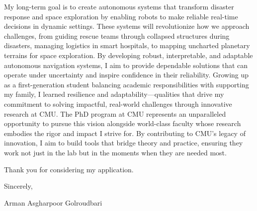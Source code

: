 \documentclass[12pt]{article}
\begin{document}
My long-term goal is to create autonomous systems that transform disaster response and space exploration by enabling robots to make reliable real-time decisions in dynamic settings. These systems will revolutionize how we approach challenges, from guiding rescue teams through collapsed structures during disasters, managing logistics in smart hospitals, to mapping uncharted planetary terrains for space exploration. By developing robust, interpretable, and adaptable autonomous navigation systems, I aim to provide dependable solutions that can operate under uncertainty and inspire confidence in their reliability. Growing up as a first-generation student balancing academic responsibilities with supporting my family, I learned resilience and adaptability—qualities that drive my commitment to solving impactful, real-world challenges through innovative research at CMU. The PhD program at CMU represents an unparalleled opportunity to pursue this vision alongside world-class faculty whose research embodies the rigor and impact I strive for. By contributing to CMU’s legacy of innovation, I aim to build tools that bridge theory and practice, ensuring they work not just in the lab but in the moments when they are needed most.




\vspace{0.05cm}
Thank you for considering my application.\vspace{-0.1cm}

Sincerely, \vspace{-0.1cm}

Arman Asgharpoor Golroudbari




\small


\end{document}
